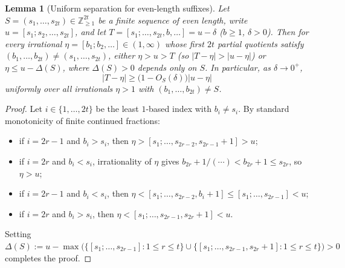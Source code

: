 \documentclass[11pt]{amsart}
\newtheorem{lemma}[theorem]{Lemma}
\theoremstyle{definition}
\theoremstyle{remark}
\numberwithin{equation}{section}
\newcommand{\Z}{\mathbb{Z}}
\begin{document}
\begin{lemma}[Uniform separation for even-length suffixes]\label{lem:even-suffix-sep}
Let $S=(s_1,\ldots,s_{2t})\in\Z_{\ge1}^{2t}$ be a finite sequence of even
length, write $u=[s_1;s_2,\ldots,s_{2t}]$, and let
$T=[s_1;\ldots,s_{2t},b,\ldots]=u-\delta$ ($b\ge1$, $\delta>0$). Then for
every irrational $\eta=[b_1;b_2,\ldots]\in(1,\infty)$ whose first $2t$
partial quotients satisfy $(b_1,\ldots,b_{2t})\ne(s_1,\ldots,s_{2t})$,
either $\eta>u>T$ (so $|T-\eta|>|u-\eta|$) or $\eta\le u-\Delta(S)$, where
$\Delta(S)>0$ depends only on $S$. In particular, as $\delta\to0^+$,
\[
 |T-\eta|\ge\bigl(1-O_S(\delta)\bigr)|u-\eta|
\]
uniformly over all irrationals $\eta>1$ with $(b_1,\ldots,b_{2t})\ne S$.
\end{lemma}
\begin{proof}
Let $i\in\{1,\ldots,2t\}$ be the least $1$-based index with $b_i\ne s_i$.
By standard monotonicity of finite continued fractions:
\begin{itemize}
\item if $i=2r-1$ and $b_i>s_i$, then $\eta>[s_1;\ldots,s_{2r-2},s_{2r-1}+1]>u$;
\item if $i=2r$ and $b_i<s_i$, irrationality of $\eta$ gives
      $b_{2r}+1/(\cdots)<b_{2r}+1\le s_{2r}$, so $\eta>u$;
\item if $i=2r-1$ and $b_i<s_i$, then
      $\eta<[s_1;\ldots,s_{2r-2},b_i+1]\le[s_1;\ldots,s_{2r-1}]<u$;
\item if $i=2r$ and $b_i>s_i$, then $\eta<[s_1;\ldots,s_{2r-1},s_{2r}+1]<u$.
\end{itemize}
Setting
$\Delta(S):=u-\max\bigl(\{[s_1;\ldots,s_{2r-1}]:1\le r\le t\}\cup\{[s_1;\ldots,s_{2r-1},s_{2r}+1]:1\le r\le t\}\bigr)>0$
completes the proof.
\end{proof}
\end{document}
